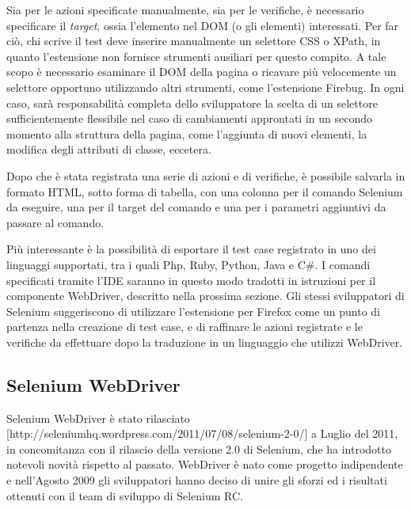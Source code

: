 Sia per le azioni specificate manualmente, sia per le verifiche, è necessario specificare il \emph{target}, ossia l'elemento nel DOM (o gli elementi) interessati. Per far ciò, chi scrive il test deve inserire manualmente un selettore CSS o XPath, in quanto l'estensione non fornisce strumenti ausiliari per questo compito. A tale scopo è necessario esaminare il DOM della pagina o ricavare più velocemente un selettore opportuno utilizzando altri strumenti, come l'estensione Firebug. In ogni caso,   sarà responsabilità completa dello sviluppatore la scelta di un selettore sufficientemente flessibile nel caso di cambiamenti approntati in un secondo momento alla struttura della pagina, come l'aggiunta di nuovi elementi, la modifica degli attributi di classe, eccetera. 

Dopo che è stata registrata una serie di azioni e di verifiche, è possibile salvarla in formato HTML, sotto forma di tabella, con una colonna per il comando Selenium da eseguire, una per il target del comando e una per i parametri aggiuntivi da passare al comando.

Più interessante è la possibilità di esportare il test case registrato in uno dei linguaggi supportati, tra i quali Php, Ruby, Python, Java e C\#. I comandi specificati tramite l'IDE saranno in questo modo tradotti in istruzioni per il componente WebDriver, descritto nella prossima sezione. Gli stessi sviluppatori di Selenium suggeriscono di utilizzare l'estensione per Firefox come un punto di partenza nella creazione di test case, e di raffinare le azioni registrate e le verifiche da effettuare dopo la traduzione in un linguaggio che utilizzi WebDriver.

\subsection{Selenium WebDriver}

Selenium WebDriver è stato rilasciato [http://seleniumhq.wordpress.com/2011/07/08/selenium-2-0/] a Luglio del 2011, in concomitanza con il rilascio della versione 2.0 di Selenium, che ha introdotto notevoli novità rispetto al passato.
WebDriver è nato come progetto indipendente e nell'Agosto 2009 gli sviluppatori hanno deciso di unire gli sforzi ed i risultati ottenuti con il team di sviluppo di Selenium RC.

